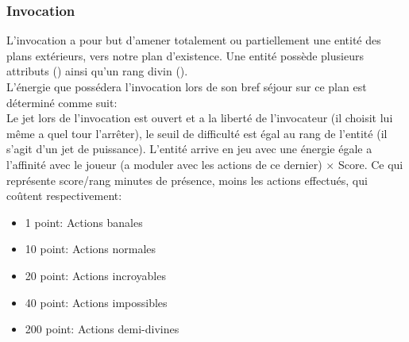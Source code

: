 \subsubsection{Invocation}
L'invocation a pour but d'amener totalement ou partiellement une entité des plans extérieurs, vers notre plan d'existence.
Une entité possède plusieurs attributs () ainsi qu'un rang divin ().\\
L'énergie que possédera l'invocation lors de son bref séjour sur ce plan est déterminé comme suit:\\
Le jet lors de l'invocation est ouvert et a la liberté de l'invocateur 
(il choisit lui même a quel tour l'arrêter), le seuil de difficulté est égal au rang de l'entité (il s’agit d’un jet de puissance).
L'entité arrive en jeu avec une énergie égale a l'affinité avec le joueur (a moduler avec les actions de ce dernier) $\times$ Score.
Ce qui représente score/rang minutes de présence, moins les actions effectués, qui coûtent respectivement:
\begin{itemize}
    \item 1 point: Actions banales
    \item 10 point: Actions normales
    \item 20 point: Actions incroyables
    \item 40 point: Actions impossibles
    \item 200 point: Actions demi-divines
\end{itemize}

